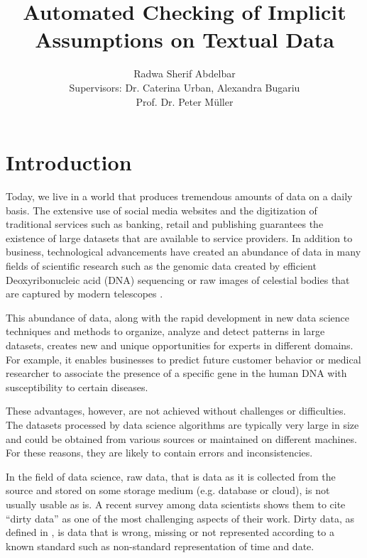 \documentclass[10pt]{report}
\title{Automated Checking of Implicit Assumptions on Textual Data}
\author{Radwa Sherif Abdelbar \\
	 Supervisors: Dr. Caterina Urban, Alexandra Bugariu \\ Prof. Dr. Peter M{\"u}ller}
\begin{document}
\maketitle



\begin{abstract}

\end{abstract}

\chapter{Introduction}

Today, we live in a world that produces tremendous amounts of data on a daily basis. The extensive use of social media websites and the digitization of traditional services such as banking, retail and publishing guarantees the existence of large datasets that are available to service providers. In addition to business, technological advancements have created an abundance of data in many fields of scientific research such as the genomic data created by efficient Deoxyribonucleic acid (DNA) sequencing or raw images of celestial bodies that are captured by modern telescopes \cite{blei2017science}. 

This abundance of data, along with the rapid development in new data science techniques and methods to organize, analyze and detect patterns in large datasets, creates new and unique opportunities for experts in different domains. For example, it enables businesses to predict future customer behavior or medical researcher to associate the presence of a specific gene in the human DNA with susceptibility to certain diseases. 

These advantages, however, are not achieved without challenges or difficulties. The datasets processed by data science algorithms are typically very large in size and could be obtained from various sources or maintained on different machines. For these reasons, they are likely to contain errors and inconsistencies. 

In the field of data science, raw data, that is data as it is collected from the source and stored on some storage medium (e.g. database or cloud), is not usually usable as is. A recent survey among data scientists \cite{kaggle} shows them to cite ``dirty data'' as one of the most challenging aspects of their work. Dirty data, as defined in \cite{dirty-data}, is data that is wrong, missing or not represented according to a known standard such as non-standard representation of time and date.
\end{document}
